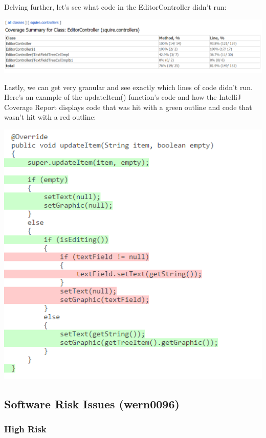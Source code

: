 \documentclass[twoside,letterpaper]{article}
\begin{document}
\noindent Delving further, let's see what code in the EditorController didn't run: 

\noindent\includegraphics[width=\textwidth]{images/TestPlan/EditorControllerCoverage} 

\noindent Lastly, we can get very granular and see exactly which lines of code didn't run. Here's an example of the updateItem() function's code and how the IntelliJ Coverage Report displays code that was hit with a green outline and code that wasn't hit with a red outline:

\noindent\includegraphics[scale=0.7]{images/TestPlan/EditorControllerCoverageFunction}


\newpage
\subsection{Software Risk Issues (wern0096)}

\subsubsection{High Risk}
\end{document}
